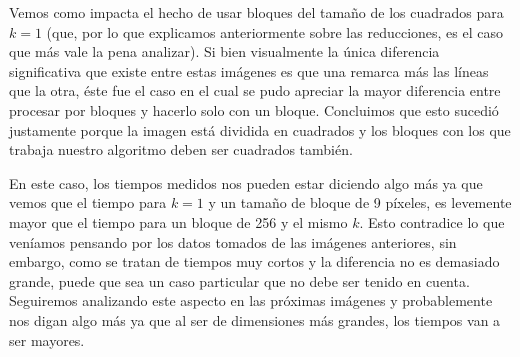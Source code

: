\documentclass[a4paper]{article}
\begin{document}
Vemos como impacta el hecho de usar bloques del tamaño de los cuadrados para $k = 1$ (que, por lo que explicamos anteriormente sobre las reducciones, es el caso que más vale la pena analizar). Si bien visualmente la única diferencia significativa que existe entre estas imágenes es que una remarca más las líneas que la otra, éste fue el caso en el cual se pudo apreciar la mayor diferencia entre procesar por bloques y hacerlo solo con un bloque. Concluimos que esto sucedió justamente porque la imagen está dividida en cuadrados y los bloques con los que trabaja nuestro algoritmo deben ser cuadrados también.
\par En este caso, los tiempos medidos nos pueden estar diciendo algo más ya que vemos que el tiempo para $k = 1$ y un tamaño de bloque de 9 píxeles, es levemente mayor que el tiempo para un bloque de 256 y el mismo $k$. Esto contradice lo que veníamos pensando por los datos tomados de las imágenes anteriores, sin embargo, como se tratan de tiempos muy cortos y la diferencia no es demasiado grande, puede que sea un caso particular que no debe ser tenido en cuenta. Seguiremos analizando este aspecto en las próximas imágenes y probablemente nos digan algo más ya que al ser de dimensiones más grandes, los tiempos van a ser mayores.
\end{document}
